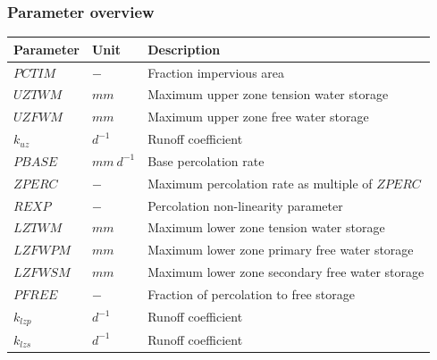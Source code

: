 \newpage
\subsubsection{Parameter overview}
\begin{table}[htbp]
  \centering
    \begin{tabular}{lll}
    \toprule
    Parameter & Unit  & Description \\
    \midrule
    $PCTIM$ & $-$   & Fraction impervious area \\
    $UZTWM$ & $mm$  & Maximum upper zone tension water storage \\
    $UZFWM$ & $mm$  & Maximum upper zone free water storage \\
    $k_{uz}$ & $d^{-1}$ & Runoff coefficient \\
    $PBASE$ & $mm~d^{-1}$ & Base percolation rate \\
    $ZPERC$ & $-$   & Maximum percolation rate as multiple of $ZPERC$ \\
    $REXP$ & $-$   & Percolation non-linearity parameter \\
    $LZTWM$ & $mm$  & Maximum lower zone tension water storage \\
    $LZFWPM$ & $mm$  & Maximum lower zone primary free water storage \\
    $LZFWSM$ & $mm$  & Maximum lower zone secondary free water storage \\
    $PFREE$ & $-$   & Fraction of percolation to free storage \\
    $k_{lzp}$ & $d^{-1}$ & Runoff coefficient \\
    $k_{lzs}$ & $d^{-1}$ & Runoff coefficient \\
    \bottomrule
    \end{tabular}%
  \label{tab:addlabel}%
\end{table}%

